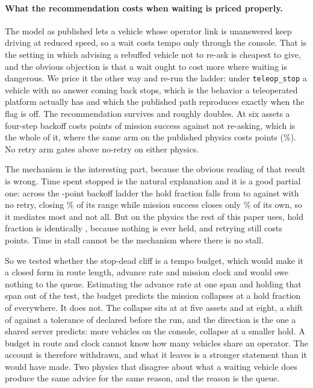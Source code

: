 \documentclass[11pt]{article}
\begin{document}
\paragraph{What the recommendation costs when waiting is priced properly.} The model as published lets a vehicle whose operator link is unanswered keep driving at reduced speed, so a wait costs tempo only through the console. That is the setting in which advising a rebuffed vehicle not to re-ask is cheapest to give, and the obvious objection is that a wait ought to cost more where waiting is dangerous. We price it the other way and re-run the ladder: under \texttt{teleop\_stop} a vehicle with no answer coming back stops, which is the behavior a teleoperated platform actually has and which the published path reproduces exactly when the flag is off. The recommendation survives and roughly doubles. At six assets a four-step backoff costs \tpStopRZeroFourNSix{} points of mission success against not re-asking, which is the whole of it, where the same arm on the published physics costs \tpKeepRZeroFourNSix{} points (\tpKeepRZeroFourNSixPct\%). No retry arm gates above no-retry on either physics.

The mechanism is the interesting part, because the obvious reading of that result is wrong. Time spent stopped is the natural explanation and it is a good partial one: across the \tpLadder{}-point backoff ladder the hold fraction falls from \tpHoldHi{} to \tpHoldLong{} against \tpHoldLo{} with no retry, closing \tpHoldClosed\% of its range while mission success closes only \tpSuccClosed\% of its own, so it mediates most and not all. But on the physics the rest of this paper uses, hold fraction is identically \tpKeepHold{}, because nothing is ever held, and retrying still costs \tpKeepRZeroFourNSix{} points. Time in stall cannot be the mechanism where there is no stall.

So we tested whether the stop-dead cliff is a tempo budget, which would make it a closed form in route length, advance rate and mission clock and would owe nothing to the queue. Estimating the advance rate at one span and holding that span out of the test, the budget predicts the mission collapses at a hold fraction of \tpHStar{} everywhere. It does not. The collapse sits at \tpSepFive{} at five assets and \tpSepEight{} at eight, a shift of \tpSepShift{} against a tolerance of \tpSepTol{} declared before the run, and the direction is the one a shared server predicts: more vehicles on the console, collapse at a smaller hold. A budget in route and clock cannot know how many vehicles share an operator. The account is therefore withdrawn, and what it leaves is a stronger statement than it would have made. Two physics that disagree about what a waiting vehicle does produce the same advice for the same reason, and the reason is the queue.
\end{document}
